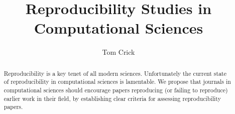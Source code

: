\documentclass{article}
\begin{document}
%

\title{Reproducibility Studies in Computational Sciences
%
}

%
%
%
%
%
%
\author{
%
%
Tom Crick
}

\maketitle

\begin{abstract}
Reproducibility is a key tenet of all modern sciences.  Unfortunately
the current state of reproducibility in computational sciences is
lamentable.  We propose that journals in computational sciences should
encourage papers reproducing (or failing to reproduce) earlier work in
their field, by establishing clear criteria for assessing
reproducibility papers.
\end{abstract}
\end{document}
